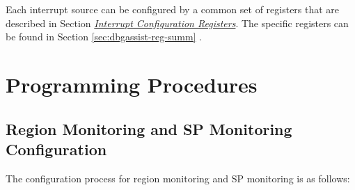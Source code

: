 \documentclass[main\_\_EN.tex]{subfiles}
\begin{document}
Each interrupt source can be configured by a common set of registers that are described in Section \hyperref[interrupt-config-registers]{\textit{Interrupt Configuration Registers}}. The specific registers can be found in Section \ref{sec:dbgassist-reg-summ} \textit{}.

\section{Programming Procedures}
\label{sec:dbgassist-prog-procedures}

\subsection{Region Monitoring and SP Monitoring Configuration}

The configuration process for region monitoring and SP monitoring is as follows:
\end{document}
